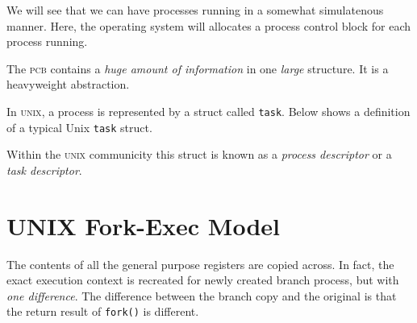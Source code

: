 We will see that we can have processes running in a somewhat simulatenous manner.
Here, the operating system will allocates 
a process control block for each process running. 

The \textsc{pcb} contains a \textit{huge amount of information} in
one \textit{large} structure. It is a heavyweight abstraction.


\begin{example}
In \textsc{unix}, a process is represented by a struct called \lstinline{task}. 
Below shows a definition of a typical Unix \lstinline{task} struct.  
\end{example}

Within the \textsc{unix} communicity this struct is known as a \textit{process descriptor}
or a \textit{task descriptor}.







\section{UNIX Fork-Exec Model}



The contents of all the general purpose registers are copied across. 
In fact, the exact execution context is recreated for newly created branch process, 
but with \textit{one difference}. 
The difference between the branch copy and the original is
that the return result of \lstinline{fork()} is different.

\begin{figure}[h]
\end{figure}


